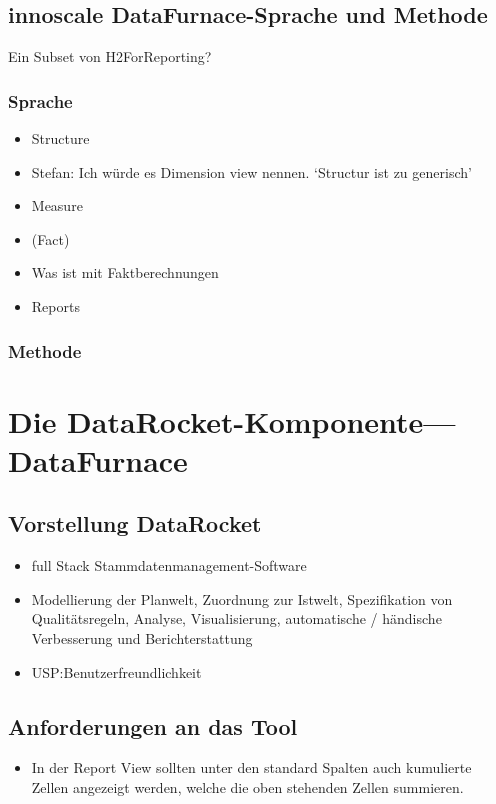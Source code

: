 \documentclass[
  language=german, %
  type=bachelor%
]{isthesis}
\begin{document}
\begin{content}
  \section{innoscale DataFurnace-Sprache und Methode}
  Ein Subset von H2ForReporting?
  \subsection{Sprache}
  \begin{itemize}
    \item Structure
    \item Stefan: Ich würde es Dimension view nennen. `Structur ist zu generisch'
    \item Measure
    \item (Fact)
    \item Was ist mit Faktberechnungen
    \item Reports
  \end{itemize}

  \subsection{Methode}


  \chapter{Die DataRocket-Komponente---DataFurnace}

  \section{Vorstellung DataRocket}
  \begin{itemize}
    \item full Stack Stammdatenmanagement-Software
    \item Modellierung der Planwelt, Zuordnung zur Istwelt, Spezifikation von
      Qualitätsregeln, Analyse, Visualisierung, automatische / händische
      Verbesserung und Berichterstattung
    \item USP:\@ Benutzerfreundlichkeit 
  \end{itemize}


  \section{Anforderungen an das Tool}
  \begin{itemize}
    \item In der Report View sollten unter den standard Spalten auch kumulierte
      Zellen angezeigt werden, welche die oben stehenden Zellen summieren.
  \end{itemize}



\end{content}
\end{document}
